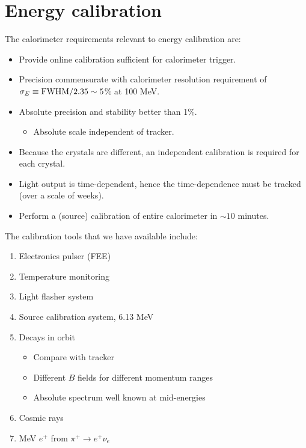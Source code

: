 \section{Energy calibration}
\def\color#1{\relax}
\def\textcolor#1#2{#2}

The calorimeter requirements relevant to energy calibration are:

\begin{itemize}
\item Provide online calibration sufficient for calorimeter trigger.
\item Precision commensurate with calorimeter resolution requirement of $\sigma_E\equiv \hbox{FWHM}/2.35 \sim 5$\% at 100 MeV. %
\item Absolute precision and stability better than 1\%.
\begin{itemize}
\item Absolute scale independent of tracker.
\end{itemize}
\item Because the crystals are different, an independent calibration is required for each crystal. 
\item Light output is time-dependent, hence the time-dependence must be tracked (over a scale of weeks).
\item Perform a (source) calibration of entire calorimeter in $\sim10$ minutes.
\end{itemize}

The calibration tools that we have available include:

\begin{enumerate}
\item Electronics pulser (FEE)
\item Temperature monitoring
 \item Light flasher system %
 \item  {\color{red} Source calibration system, 6.13 MeV} %
 \item {\color{magenta} Decays in orbit} %
\begin{itemize}
\item Compare with tracker 
\item Different $B$ fields for different momentum ranges 
\item Absolute spectrum well known at mid-energies 
\end{itemize}
 \item {\color{blue} Cosmic rays} %
 \item {\color{brown} 70 MeV $e^+$ from $\pi^+\to e^+\nu_e$} 
\end{enumerate}

